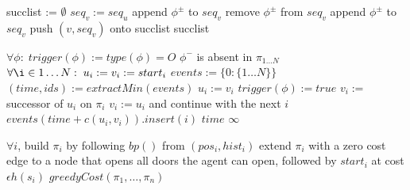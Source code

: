 \documentclass[letterpaper]{article}
\begin{document}
\begin{algorithm}
\caption{$successors(u, seq_u)$}
\label{alg:update}
\begin{algorithmic}
\STATE succlist := $\emptyset$
\STATE $seq_v := seq_u$
\STATE append $\phi^\pm$ to $seq_v$
\ENDFOR
{}
\STATE remove $\phi^\pm$ from $seq_v$
\STATE append $\phi^\pm$ to $seq_v$
\ENDFOR
\STATE push $(v,seq_v)$ onto succlist
\ENDFOR
\RETURN succlist
\end{algorithmic}
\end{algorithm}

\begin{algorithm}
\caption{$greedyCost(\pi_1,\ldots,\pi_n)$}
\label{alg:update}
\begin{algorithmic}
\STATE $\forall\phi:\; trigger(\phi) := type(\phi) = O$ \OR $\phi^-$ is absent in $\pi_{1\ldots N}$
\STATE $\forall \i\in 1\ldots N:\; u_i := v_i := start_i$
\STATE $events := \{0: \{1\ldots N\}\}$
\STATE $(time, ids) := extractMin(events)$
\STATE $u_i := v_i$
\STATE $trigger(\phi) := true$
\ENDIF
\ENDFOR
\ENDFOR
{}
\STATE $v_i :=$ successor of $u_i$ on $\pi_i$
\STATE $v_i := u_i$ and continue with the next $i$
\ENDIF
\ENDFOR
\STATE $events(time+c(u_i,v_i)).insert(i)$
\ENDFOR
\ENDWHILE
{}
\RETURN $time$
\ELSE
\RETURN $\infty$
\ENDIF
\end{algorithmic}
\end{algorithm}

\begin{algorithm}
\caption{$jointPriority((pos_1,hist_1),\ldots,(pos_N,hist_N))$}
\label{alg:update}
\begin{algorithmic}
\STATE $\forall i$, build $\pi_i$ by following $bp()$ from $(pos_i, hist_i)$
\STATE extend $\pi_i$ with a zero cost edge to a node that opens all doors the agent can open, followed by $start_i$ at cost $\epsilon h(s_i)$
\ENDFOR
\RETURN $greedyCost(\pi_1,\ldots,\pi_n)$
\end{algorithmic}
\end{algorithm}



\end{document}
